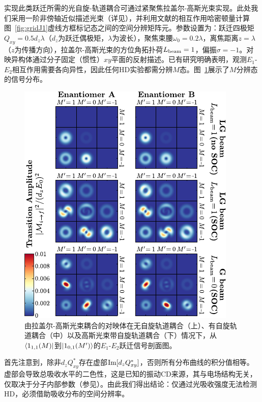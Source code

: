 \documentclass[reprint,aps,prl,twocolumn,superscriptaddress,groupedaddress]{revtex4-2}
\newcommand{\eoet}{$E_1$-$E_2$}
\begin{document}
实现此类跃迁所需的光自旋-轨道耦合可通过紧聚焦拉盖尔-高斯光束实现\cite{Loeffler2011,Forbes2021nonparaxial,Forbes2021longitudinal}。此处我们采用一阶非傍轴近似描述光束\cite{Lax1975}（详见\cite{Note1}），并利用文献\cite{Maslov2024,Maslov_Thesis}的相互作用哈密顿量计算图~\ref{fig:gridJ1}虚线方框标记态之间的空间分辨矩阵元。参数设置为：跃迁四极矩$Q_{xy}=0.5d_z\lambda$（$d_z$为跃迁偶极矩，$\lambda$为波长），聚焦束腰$\omega_0=0.2\lambda$，离焦距离$z=\lambda$（$z$为传播方向），拉盖尔-高斯光束的方位角拓扑荷$L_{\rm beam}=1$，偏振$\sigma=-1$。对映异构体通过分子固定（惯性）$xy$平面的反射描述。已有研究明确表明\cite{Buckingham1971, Power1975}，观测\eoet 相互作用需要各向异性，因此任何HD实验都需分辨$M$态。图~\ref{fig:profiles}展示了$M$分辨态的信号分布。
\begin{figure}[t!]
    \centering
    \includegraphics[width=1.0\columnwidth]{Figure2.pdf}
    \caption{由拉盖尔-高斯光束耦合的对映体在无自旋轨道耦合（上）、有自旋轨道耦合（中）以及高斯光束带自旋轨道耦合（下）情况下，从$\bra{1_{1,1}(M)}$到$\ket{1_{0,1}(M')}$的\eoet 跃迁信号剖面图。}
    \label{fig:profiles}
\end{figure}
首先注意到，除非$d_zQ_{xy}^*$存在虚部${\rm Im}[d_zQ_{xy}^*]$，否则所有分布曲线的积分值相等。虚部会导致总吸收水平的二色性，这是已知的振动CD来源，其与电场结构无关，仅取决于分子内部参数（参见\cite{Buckingham1971}）。由此我们得出结论：仅通过光吸收强度无法检测HD，必须借助吸收分布的空间分辨率\cite{Loeffler2011}。
\end{document}
